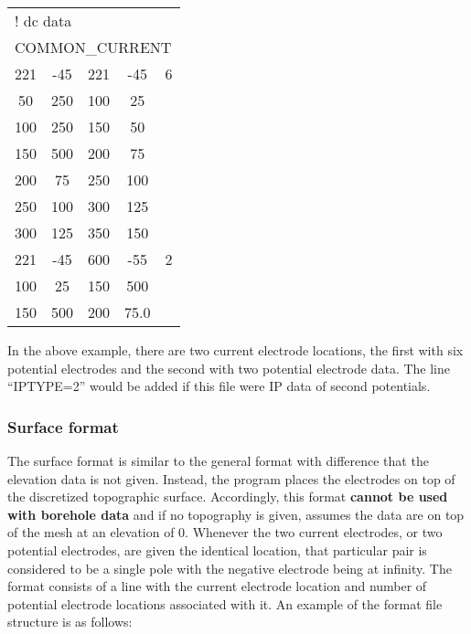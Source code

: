 \begin{fileExample}
\begin{tabular}{|ccccc|}
\hline
\multicolumn{5}{|l|}{! dc data} \\
\multicolumn{5}{|l|}{COMMON\_CURRENT} \\
221 & -45 &  221  & -45  &  6 \\
50 &  250 &  100  & 25  &   \\
100 & 250  & 150  & 50 &   \\
150 & 500  & 200 & 75  &     \\
200 & 75 &  250  &  100 & \\
250 & 100 &  300 & 125 &    \\
300 & 125 &  350 & 150  &    \\
221 & -45 &  600 & -55 &  2  \\
100 &  25 &  150 &  500  &  \\
150 &  500  & 200 &  75.0 &   \\
\hline
\end{tabular}
\end{fileExample}
%
In the above example, there are two current electrode locations, the first with six potential electrodes and the second with two potential electrode data. The line ``IPTYPE=2'' would be added if this file were IP data of second potentials. 

\subsubsection*{Surface format}
The surface format is similar to the general format with difference that the elevation data is not given. Instead, the program places the electrodes on top of the discretized topographic surface. Accordingly, this format \textbf{cannot be used with borehole data} and if no topography is given, assumes the data are on top of the mesh at an elevation of 0. Whenever the two current electrodes, or two potential electrodes, are given the identical location, that particular pair is considered to be a single pole with the negative electrode being at infinity. The format consists of a line with the current electrode location and number of potential electrode locations associated with it. An example of the  format file structure is as follows:

